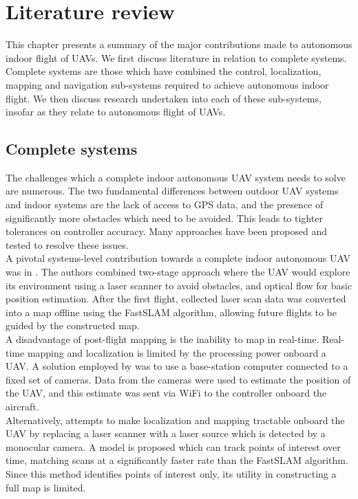 \documentclass[capstone_report.tex]{subfiles}
\begin{document}
\chapter{Literature review}
This chapter presents a summary of the major contributions made to autonomous indoor flight of UAVs. We first discuss literature in relation to complete systems. Complete systems are those which have combined the control, localization, mapping and navigation sub-systems required to achieve autonomous indoor flight. We then discuss research undertaken into each of these sub-systems, insofar as they relate to autonomous flight of UAVs.\\

\section{Complete systems}
The challenges which a complete indoor autonomous UAV system needs to solve are numerous. The two fundamental differences between outdoor UAV systems and indoor systems are the lack of access to GPS data, and the presence of significantly more obstacles which need to be avoided. This leads to tighter tolerances on controller accuracy. Many approaches have been proposed and tested to resolve these issues.\\

A pivotal systems-level contribution towards a complete indoor autonomous UAV was in \cite{feicui}. The authors combined two-stage approach where the UAV would explore its environment using a laser scanner to avoid obstacles, and optical flow for basic position estimation. After the first flight, collected laser scan data was converted into a map offline using the FastSLAM algorithm, allowing future flights to be guided by the constructed map. \\

A disadvantage of post-flight mapping is the inability to map in real-time. Real-time mapping and localization is limited by the processing power onboard a UAV. A solution employed by \cite{yu:ccdc:2017} was to use a base-station computer connected to a fixed set of cameras. Data from the cameras were used to estimate the position of the UAV, and this estimate was sent via WiFi to the controller onboard the aircraft. \\

Alternatively, \cite{qzeng} attempts to make localization and mapping tractable onboard the UAV by replacing a laser scanner with a laser source which is detected by a monocular camera. A model is proposed which can track points of interest over time, matching scans at a significantly faster rate than the FastSLAM algorithm. Since this method identifies points of interest only, its utility in constructing a full map is limited.\\
\end{document}
